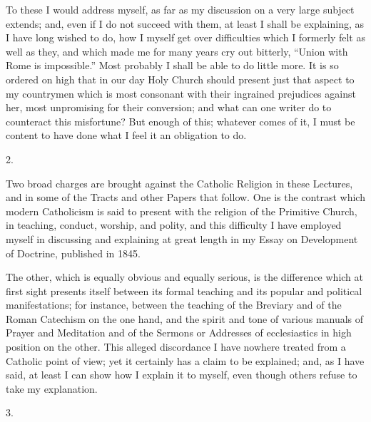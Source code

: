 To these I would address myself, as far as my discussion on a very
large subject extends; and, even if I do not succeed with them, at
least I shall be explaining, as I have long wished to do, how I myself
get over difficulties which I formerly felt as well as they, and which
made me for many years cry out bitterly, ``Union with
Rome is impossible.'' Most probably I shall be able to do little
more. It is so ordered on high that in our day Holy Church should
present just that aspect to my countrymen which is most consonant with
their ingrained prejudices against her, most unpromising for their
conversion; and what can one writer do to counteract this misfortune?
But enough of this; whatever comes of it, I must be content to have
done what I feel it an obligation to do.

2.

Two broad charges are brought against the Catholic Religion in
these Lectures, and in some of the Tracts and other Papers that
follow. One is the contrast which modern Catholicism is said to
present with the religion of the Primitive Church, in teaching,
conduct, worship, and polity, and this difficulty I have employed
myself in discussing and explaining at great length in my Essay on
Development of Doctrine, published in 1845.

The other, which is equally obvious and equally serious, is the
difference which at first sight presents itself between its formal
teaching and its popular and political manifestations; for instance,
between the teaching of the Breviary and of the Roman Catechism on the
one hand, and the spirit and tone of various manuals of Prayer and
Meditation and of the Sermons or Addresses of ecclesiastics in high position on the other. This alleged discordance I have nowhere treated
from a Catholic point of view; yet it certainly has a claim to be
explained; and, as I have said, at least I can show how I explain it
to myself, even though others refuse to take my explanation.

3.

